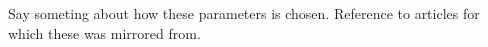 


Say someting about how these parameters is chosen. Reference to articles for which these was mirrored from. 






